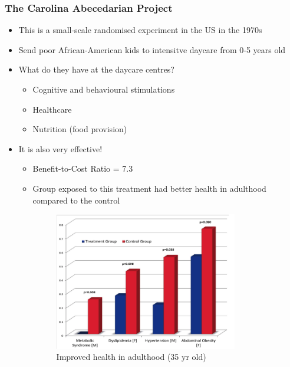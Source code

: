 \subsubsection{The Carolina Abecedarian Project}
\begin{itemize}
    \item This is a small-scale randomised experiment in the US in the 1970s
    \item Send poor African-American kids to intensitve daycare from 0-5 years old
    \item What do they have at the daycare centres?
    \begin{itemize}
        \item Cognitive and behavioural stimulations
        \item Healthcare
        \item Nutrition (food provision)
    \end{itemize}
\item It is also very effective!
\begin{itemize}
    \item Benefit-to-Cost Ratio = 7.3
    \item Group exposed to this treatment had better health in adulthood compared to the control
        \begin{figure}[H]%
    \centering
    \includegraphics[width=8cm]{images/ch4/CAP_eval.png}
    \caption{Improved health in adulthood (35 yr old)}
    \label{CAP_eval}
    \end{figure}
\end{itemize}
\end{itemize}

